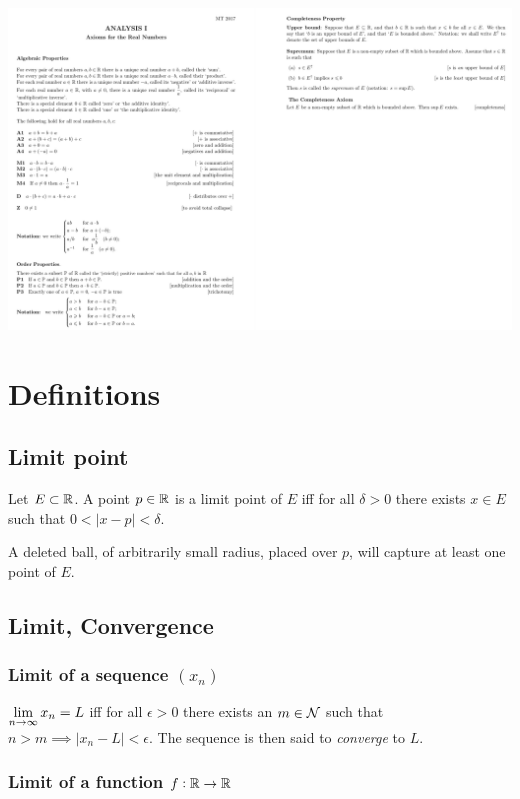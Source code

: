 \begin{mdframed}
\includegraphics[width=400pt]{img/oxford-prelims-M2-analysis-I-axioms-for-real-numbers.png}
\end{mdframed}
\section{Definitions}

\subsection{Limit point}
Let $E \subset \R$. A point $p \in \R$ is a limit point of $E$ iff for all $\delta > 0$ there
exists $x \in E$ such that $0 < |x - p| < \delta$.

\begin{intuition*}
  A deleted ball, of arbitrarily small radius, placed over $p$, will capture at least one point of
  $E$.
\end{intuition*}

\subsection{Limit, Convergence}

\subsubsection{Limit of a sequence $(x_n)$}
$\LimEq{x_n}{L}{n}{\infty}$ iff for all $\epsilon > 0$ there exists an $m \in \N$ such that
$n > m \implies |x_n - L| < \epsilon$. The sequence is then said to \textit{converge} to $L$.

\subsubsection{Limit of a function $f:\R\to\R$}


